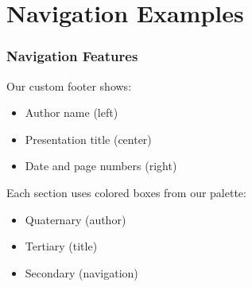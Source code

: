 \documentclass{beamer}
\begin{document}
\section{Navigation Examples}

\begin{frame}
\frametitle{Navigation Features}

Our custom footer shows:
\begin{itemize}
    \item Author name (left)
    \item Presentation title (center)
    \item Date and page numbers (right)
\end{itemize}

\vspace{1em}

Each section uses colored boxes from our palette:
\begin{itemize}
    \item Quaternary (author)
    \item Tertiary (title)
    \item Secondary (navigation)
\end{itemize}
\end{frame}
\end{document}
